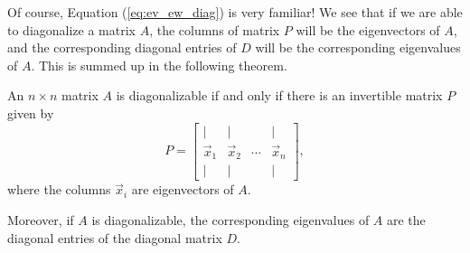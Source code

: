 \documentclass{ximera}
\begin{document}
Of course, Equation (\ref{eq:ev_ew_diag}) is very familiar!  We see that if we are able to diagonalize a matrix $A$, the columns of matrix $P$ will be the eigenvectors of $A$, and the corresponding diagonal entries of $D$ will be the corresponding eigenvalues of $A$.  This is summed up in the following theorem.

\begin{theorem}\label{th:eigenvectorsanddiagonalizable}
An $n\times n$ matrix $A$ is diagonalizable if and only if there is an
invertible matrix $P$ given by
$$P=\begin{bmatrix}
| & | &   & | \\
\vec{x}_1 & \vec{x}_2  & \cdots & \vec{x}_n \\
| & | &   & |
\end{bmatrix},$$
where the columns $\vec{x}_i$ are eigenvectors of $A$.

Moreover, if $A$ is diagonalizable, the corresponding eigenvalues of $A$ are the
diagonal entries of the diagonal matrix $D$.
\end{theorem}
\end{document}

